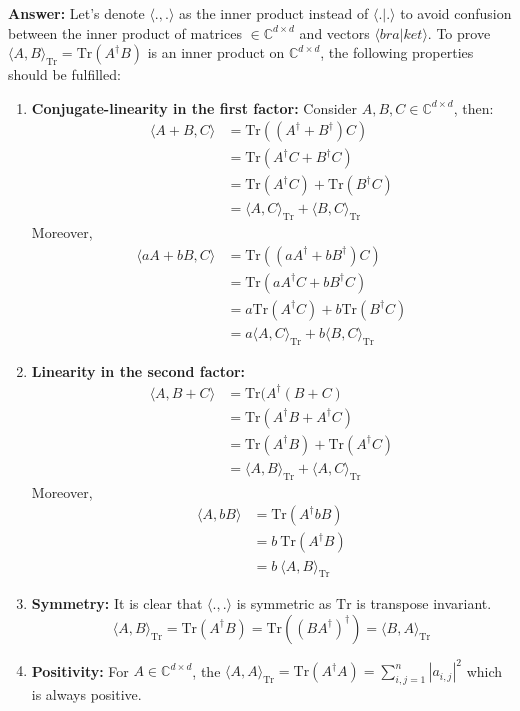 \documentclass[12pt]{article}
\renewcommand{\>}{\rangle}
\newcommand{\<}{\langle}
\newcommand{\C}{\mathbb{C}}
\begin{document}
\textbf{Answer: } Let's denote $\< . , . \>$ as the inner product instead of $\< . | . \>$ to avoid confusion between the inner product of matrices $\in \C^{d\times d}$ and vectors $\< bra | ket \>$.
To prove $\< A , B\>_{\mathrm{Tr}} = \mathrm{Tr}(A^\dagger B)$ is an inner product on $\C^{d\times d}$, the following properties should be fulfilled:
\begin{enumerate}
    \item \textbf{Conjugate-linearity in the first factor:}
    Consider $A, B, C \in\C^{d\times d}$, then:
    \begin{align*}
        \< A + B , C\> & = \mathrm{Tr}((A^\dagger + B^\dagger)  C) \\
                       & = \mathrm{Tr}(A^\dagger C + B^\dagger C) \\
                       & = \mathrm{Tr}(A^\dagger C) +  \mathrm{Tr}(B^\dagger C) \\
                       & = \<A, C\>_{\mathrm{Tr}} +  \<B, C\>_{\mathrm{Tr}}
    \end{align*}
    Moreover,
    \begin{align*}
        \< aA + bB , C\> & = \mathrm{Tr}((aA^\dagger + bB^\dagger)  C) \\
                       & = \mathrm{Tr}(aA^\dagger C + bB^\dagger C) \\
                       & = a \mathrm{Tr}(A^\dagger C) +  b \mathrm{Tr}(B^\dagger C) \\
                       & = a \<A, C\>_{\mathrm{Tr}} +  b \<B, C\>_{\mathrm{Tr}}
    \end{align*}
    \item \textbf{Linearity in the second factor:}
        \begin{align*}
        \< A , B + C\> & = \mathrm{Tr}(A^\dagger (B + C) \\
                       & = \mathrm{Tr}(A^\dagger B + A^\dagger C) \\
                       & =  \mathrm{Tr}(A^\dagger B) +   \mathrm{Tr}(A^\dagger C) \\
                       & =  \<A, B\>_{\mathrm{Tr}} +   \<A, C\>_{\mathrm{Tr}}
    \end{align*}
    Moreover,
    \begin{align*}
        \< A , bB\> & = \mathrm{Tr}(A^\dagger bB) \\
                       & = b~ \mathrm{Tr}(A^\dagger B) \\
                       & = b~ \<A, B\>_{\mathrm{Tr}}
    \end{align*}
    \item \textbf{Symmetry:} It is clear that $\< . , .\>$ is symmetric as $\mathrm{Tr}$ is transpose invariant.
    $$\< A, B \>_{\mathrm{Tr}} = \mathrm{Tr}(A^\dagger B) = \mathrm{Tr}((B A^\dagger)^\dagger) =  \< B, A \>_{\mathrm{Tr}}$$
    \item \textbf{Positivity:} For $A \in \C^{d\times d}$, the $\< A, A \>_{\mathrm{Tr}} = \mathrm{Tr}(A^\dagger A) = \sum_{i,j = 1}^{n} |a_{i,j}|^2$ which is always positive.
    
    
\end{enumerate}
\end{document}
